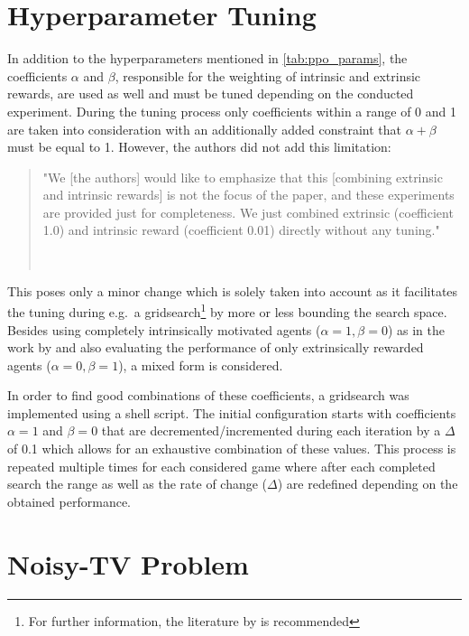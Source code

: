 \documentclass[draft,final]{vutinfth} %
\newcommand{\p}[1]{see p. #1}
\begin{document}
    \section{Hyperparameter Tuning}\label{sec:hyperparameter-tuning}

    In addition to the hyperparameters mentioned in \autoref{tab:ppo_params}, the coefficients $\alpha$ and $\beta$, responsible for the weighting of intrinsic and extrinsic rewards, are used as well and must be tuned depending on the conducted experiment.
    During the tuning process only coefficients within a range of 0 and 1 are taken into consideration with an additionally added constraint that $\alpha + \beta$ must be equal to 1.
    However, the authors did not add this limitation:
    \begin{quote}
        "We [the authors] would like to emphasize that this [combining extrinsic and intrinsic rewards] is not the focus of the paper, and these experiments are provided just for completeness.
        We just combined extrinsic (coefficient 1.0) and intrinsic reward (coefficient 0.01) directly without any tuning."

        \hfill~\cite[\p{9}]{burda_large-scale_2018-1}
    \end{quote}

    This poses only a minor change which is solely taken into account as it facilitates the tuning during e.g.\ a gridsearch\footnote{For further information, the literature by \citet[\p{420ff}]{goodfellow_deep_2016} is recommended} by more or less bounding the search space.
    Besides using completely intrinsically motivated agents ($\alpha=1,\beta=0$) as in the work by \citet{burda_large-scale_2018-1} and also evaluating the performance of only extrinsically rewarded agents ($\alpha=0,\beta=1$), a mixed form is considered.

    In order to find good combinations of these coefficients, a gridsearch was implemented using a shell script.
    The initial configuration starts with coefficients $\alpha=1$ and $\beta=0$ that are decremented/incremented during each iteration by a $\Delta$ of 0.1 which allows for an exhaustive combination of these values.
    This process is repeated multiple times for each considered game where after each completed search the range as well as the rate of change ($\Delta$) are redefined depending on the obtained performance.


    \section{Noisy-TV Problem}\label{sec:noisy-tv-problem}
\end{document}
